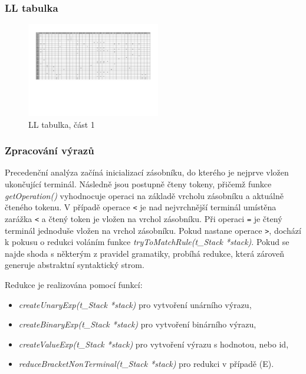 \documentclass[a4paper, 12pt]{article}
\begin{document}
\newpage

\subsubsection{LL tabulka}
\begin{figure}[ht!]
\begin{center}
  \includegraphics[angle=90,origin=c, width=0.52\textwidth]{images/LL_table_1.pdf}
  \caption{LL tabulka, část 1}
\end{center}
\end{figure}


\newpage

\subsubsection{Zpracování výrazů}
Precedenční analýza začíná inicializací zásobníku, do kterého je nejprve vložen ukončující terminál. Následně jsou postupně čteny tokeny, přičemž funkce \textit{getOperation()} vyhodnocuje operaci na základě vrcholu zásobníku a aktuálně čteného tokenu. V případě operace \texttt{<} je nad nejvrchnější terminál umístěna zarážka \texttt{<} a čtený token je vložen na vrchol zásobníku. Při operaci \texttt{=} je čtený terminál jednoduše vložen na vrchol zásobníku. Pokud nastane operace \texttt{>}, dochází k pokusu o redukci voláním funkce \textit{tryToMatchRule(t\_Stack *stack)}. Pokud se najde shoda s některým z pravidel gramatiky, probíhá redukce, která zároveň generuje abstraktní syntaktický strom.

Redukce je realizována pomocí funkcí:
\begin{itemize}
    \item \textit{createUnaryExp(t\_Stack *stack)} pro vytvoření unárního výrazu,
    \item \textit{createBinaryExp(t\_Stack *stack)} pro vytvoření binárního výrazu,
    \item \textit{createValueExp(t\_Stack *stack)} pro vytvoření výrazu s hodnotou, nebo id,
    \item \textit{reduceBracketNonTerminal(t\_Stack *stack)} pro redukci v případě (E).
\end{itemize}
\end{document}
